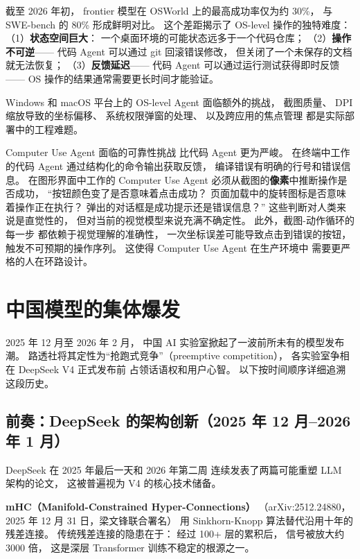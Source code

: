 截至 2026 年初，
frontier 模型在 OSWorld 上的最高成功率仅为约 30\%，
与 SWE-bench 的 80\% 形成鲜明对比。
这个差距揭示了 OS-level 操作的独特难度：
（1）\textbf{状态空间巨大}：
一个桌面环境的可能状态远多于一个代码仓库；
（2）\textbf{操作不可逆}——
代码 Agent 可以通过 git 回滚错误修改，
但关闭了一个未保存的文档就无法恢复；
（3）\textbf{反馈延迟}——
代码 Agent 可以通过运行测试获得即时反馈——
OS 操作的结果通常需要更长时间才能验证。

Windows 和 macOS 平台上的 OS-level Agent
面临额外的挑战，
截图质量、
DPI 缩放导致的坐标偏移、
系统权限弹窗的处理、
以及跨应用的焦点管理
都是实际部署中的工程难题。

\begin{warnbox}
Computer Use Agent 面临的可靠性挑战
比代码 Agent 更为严峻。
在终端中工作的代码 Agent
通过结构化的命令输出获取反馈，
编译错误有明确的行号和错误信息。
在图形界面中工作的 Computer Use Agent
必须从截图的\textbf{像素}中推断操作是否成功，
“按钮颜色变了是否意味着点击成功？
页面加载中的旋转图标是否意味着操作正在执行？
弹出的对话框是成功提示还是错误信息？”
这些判断对人类来说是直觉性的，
但对当前的视觉模型来说充满不确定性。
此外，截图-动作循环的每一步
都依赖于视觉理解的准确性，
一次坐标误差可能导致点击到错误的按钮，
触发不可预期的操作序列。
这使得 Computer Use Agent 在生产环境中
需要更严格的人在环路设计。
\end{warnbox}


\section{中国模型的集体爆发}
\label{sec:chinese-model-tsunami}

2025 年 12 月至 2026 年 2 月，
中国 AI 实验室掀起了一波前所未有的模型发布潮。
路透社将其定性为“抢跑式竞争”（preemptive competition），
各实验室争相在 DeepSeek V4 正式发布前
占领话语权和用户心智。
以下按时间顺序详细追溯这段历史。

\subsection{前奏：DeepSeek 的架构创新（2025 年 12 月--2026 年 1 月）}

DeepSeek 在 2025 年最后一天和 2026 年第二周
连续发表了两篇可能重塑 LLM 架构的论文，
这被普遍视为 V4 的核心技术储备。

\textbf{mHC（Manifold-Constrained Hyper-Connections）}%
（arXiv:2512.24880，2025 年 12 月 31 日，梁文锋联合署名）
用 Sinkhorn-Knopp 算法替代沿用十年的残差连接。
传统残差连接的隐患在于：
经过 100+ 层的累积后，
信号被放大约 3000 倍，
这是深层 Transformer 训练不稳定的根源之一。


